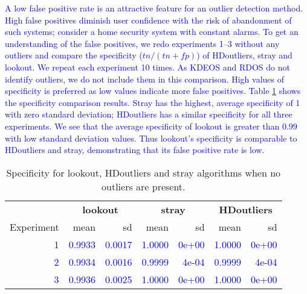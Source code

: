 \documentclass[12pt]{article}
\theoremstyle{definition}
\theoremstyle{definition}
\theoremstyle{definition}
\theoremstyle{definition}
\theoremstyle{remark}
\begin{document}
\textcolor{blue}{
A low false positive rate is an attractive feature for an outlier detection method. High false positives diminish user confidence with the risk of abandonment of such systems; consider a home security system with constant alarms. To get an understanding of the false positives, we redo experiments 1--3 without any outliers and compare the specificity ($tn/(tn+fp)$) of HDoutliers, stray and lookout. We repeat each experiment 10 times. As KDEOS and RDOS do not identify outliers, we do not include them in this comparison. High values of specificity is preferred as low values indicate more false positives. Table \ref{tab:zerooutliers} shows the specificity comparison results. Stray has the highest, average specificity of 1 with zero standard deviation;  HDoutliers has a similar specificity for all three experiments. We see that the average specificity of lookout is greater than $0.99$ with low standard deviation values. Thus lookout's specificity is comparable to HDoutliers and stray, demonstrating that its false positive rate is low. }

\begin{table}

\caption{\label{tab:zerooutliers}Specificity for lookout, HDoutliers and stray algorithms when no outliers are present.}
\centering
\fontsize{10}{12}\selectfont
\begin{tabular}[t]{rrrrrrr}
\toprule
\multicolumn{1}{c}{\textbf{}} & \multicolumn{2}{c}{\textbf{lookout}} & \multicolumn{2}{c}{\textbf{stray}} & \multicolumn{2}{c}{\textbf{HDoutliers}} \\
\cmidrule(l{3pt}r{3pt}){2-3} \cmidrule(l{3pt}r{3pt}){4-5} \cmidrule(l{3pt}r{3pt}){6-7}
Experiment & mean & sd & mean & sd & mean & sd\\
\midrule
\textcolor{blue}{1} & \textcolor{blue}{0.9933} & \textcolor{blue}{0.0017} & \textcolor{blue}{1.0000} & \textcolor{blue}{0e+00} & \textcolor{blue}{1.0000} & \textcolor{blue}{0e+00}\\
\textcolor{blue}{2} & \textcolor{blue}{0.9934} & \textcolor{blue}{0.0016} & \textcolor{blue}{0.9999} & \textcolor{blue}{4e-04} & \textcolor{blue}{0.9999} & \textcolor{blue}{4e-04}\\
\textcolor{blue}{3} & \textcolor{blue}{0.9936} & \textcolor{blue}{0.0025} & \textcolor{blue}{1.0000} & \textcolor{blue}{0e+00} & \textcolor{blue}{1.0000} & \textcolor{blue}{0e+00}\\
\bottomrule
\end{tabular}
\end{table}
\end{document}
